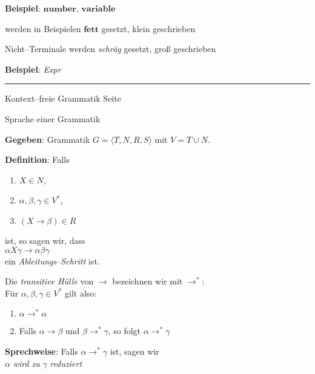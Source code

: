 \begin{slide}{}
\begin{enumerate}
      \textbf{Beispiel}: $\mathbf{number}$, $\mathbf{variable}$
    
      werden in Beispielen $\mathbf{fett}$ gesetzt, klein geschrieben
\end{enumerate}
Nicht--Terminale werden \textsl{schr\"ag} gesetzt, gro{\ss} geschrieben

\textbf{Beispiel}: \textsl{Expr}

\vspace*{\fill}
\tiny \addtocounter{mypage}{1}
\rule{17cm}{1mm}
Kontext--freie Grammatik  \hspace*{\fill} Seite 
\end{slide}


\begin{slide}{}
\normalsize

\begin{center}
Sprache einer Grammatik
\end{center}
\vspace*{0.5cm}

\footnotesize
\textbf{Gegeben}: Grammatik $G = \langle T, N, R, S \rangle$ mit $V = T \cup N$.

\textbf{Definition}: Falls
\begin{enumerate}
\item $X \in N$,
\item $\alpha, \beta, \gamma \in V^*$,
\item $(X \rightarrow \beta) \in R$
\end{enumerate}
ist, so sagen wir, dass \\[0.3cm]
\hspace*{1.3cm} $\alpha X \gamma \rightarrow \alpha \beta \gamma$ \\[0.3cm]
ein \emph{Ableitungs--Schritt}  ist.

Die \emph{transitive H\"ulle} von $\rightarrow$ bezeichnen wir mit $\rightarrow^*$: \\
F\"ur $\alpha, \beta, \gamma \in V^*$ gilt also:
\begin{enumerate}
\item $\alpha \rightarrow^* \alpha$
\item Falls $\alpha \rightarrow \beta$ und $\beta \rightarrow^* \gamma$, so folgt $\alpha \rightarrow^* \gamma$
\end{enumerate}
\textbf{Sprechweise}: Falls $\alpha \rightarrow^* \gamma$ ist, sagen wir \\[0.3cm]
\hspace*{1.3cm}  $\alpha$ \emph{wird zu} $\gamma$ \emph{reduziert}


\end{slide}
